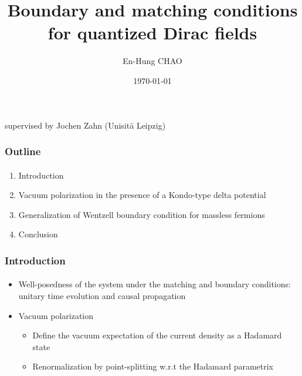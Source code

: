 \documentclass[english]{beamer}
\title{Boundary and matching conditions for quantized Dirac fields}
\author{En-Hung CHAO}
\institute{{\'E}cole Polytechnique \& Universit{\"a}t Leipzig}
\date{\today}
\begin{document}

\begin{frame}
\titlepage%
\centerline{supervised by Jochen Zahn (Unisit{\"a} Leipzig)}
\end{frame}
\begin{frame}
\frametitle{Outline}
\framesubtitle{}

\begin{enumerate}

\item Introduction
\item Vacuum polarization in the presence of a Kondo-type delta potential
\item Generalization of Wentzell boundary condition for massless fermions
\item Conclusion

\end{enumerate}

\end{frame}
\begin{frame}
\frametitle{Introduction}
\framesubtitle{}

\begin{itemize}
\item<1-> Well-posedness of the system under the matching and boundary conditions: unitary time evolution and causal propagation
\item<2-> Vacuum polarization 
	\begin{itemize}
		\item Define the vacuum expectation of the current density as a Hadamard state
		\item Renormalization by point-splitting w.r.t the Hadamard parametrix
	\end{itemize}
\end{itemize}

\end{frame}
\end{document}
